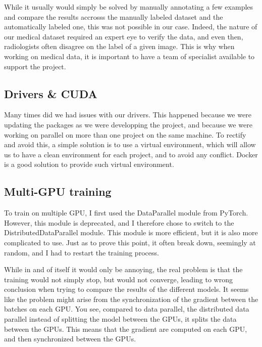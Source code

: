 \documentclass[11pt]{article}
\begin{document}
            While it usually would simply be solved by manually annotating a few examples and compare the results accrosss the manually labeled dataset
            and the automatically labeled one, this was not possible in our case. Indeed, the nature of our medical dataset required an expert eye to verify the data,
            and even then, radiologists often disagree on the label of a given image. This is why when working on medical data, it is important to have a team of specialist available to support the project.


    \subsection{Drivers \& CUDA}

        Many times did we had issues with our drivers. This happened because we were updating the packages as we were developping the project, and because we were working on parallel on more than one project
        on the same machine. To rectify and avoid this, a simple solution is to use a virtual environment, which will allow us to have a clean environment for each project, and to avoid any conflict. Docker
        is a good solution to provide such virtual environment.

    \subsection{Multi-GPU training}

        To train on multiple GPU, I first used the DataParallel module from PyTorch. However, this module is deprecated, and I therefore chose to switch to the DistributedDataParallel module. This module is more efficient, but it is also more complicated to use.
        Just as to prove this point, it often break down, seemingly at random, and I had to restart the training process.

        While in and of itself it would only be annoying, the real problem is that the training would not simply stop, but would not converge, leading to
        wrong conclusion when trying to compare the results of the different models. It seems like the problem might arise from the synchronization of the
        gradient between the batches on each GPU. You see, compared to data parallel, the distributed data parallel instead of splitting the model between the GPUs, it splits the data between the GPUs.
        This means that the gradient are computed on each GPU, and then synchronized between the GPUs.
\end{document}
